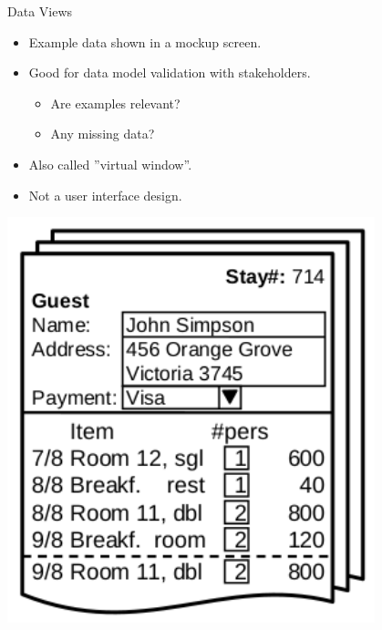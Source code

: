 \begin{Slide}{Data Views}
\begin{minipage}[t]{0.55\textwidth}
\begin{itemize}
\item Example data shown in a mockup screen.
\item Good for data model validation with stakeholders.
\begin{itemize}
\item Are examples relevant?
\item Any missing data?
\end{itemize}
\item Also called ''virtual window''.
\item Not a user interface design.
\end{itemize}
\end{minipage}%
\begin{minipage}[t]{0.45\textwidth}
\vspace{-1.0em}\hfill\includegraphics[width=0.8\textwidth]{../img/virtual-window}
\end{minipage}
\end{Slide}
